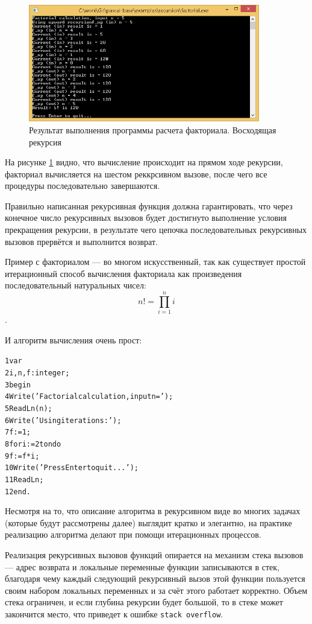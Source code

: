 \documentclass[12pt,a4paper]{article}
\begin{document}
\begin{figure}[h!]
	\centering	
	\includegraphics[width=0.9\textwidth]{images/lec14-pic02.png}
	\caption{Результат выполнения программы расчета факториала. Восходящая рекурсия}
	\label{pic02}	
\end{figure}

На рисунке \ref{pic02} видно, что вычисление происходит на прямом ходе рекурсии, факториал вычисляется на шестом реккрсивном вызове, после чего все процедуры последовательно завершаются.

Правильно написанная рекурсивная функция должна гарантировать, что через конечное число рекурсивных вызовов будет достигнуто выполнение условия прекращения рекурсии, в результате чего цепочка последовательных рекурсивных вызовов прервётся и выполнится возврат.

Пример с факториалом --- во многом искусственный, так как существует простой итерационный способ вычисления факториала как произведения последовательный натуральных чисел: 
$$n!=\prod_{i=1}^{n}i$$.

И алгоритм вычисления очень прост:

\begin{alltt}
	1 var
	2   i, n, f: integer;
	3 begin
	4   Write('Factorial calculation, input n = ');
	5   ReadLn(n);
	6   Write('Using iterations:');
	7   f := 1;
	8   for i:=2 to n do
	9     f := f * i;
	10   Write('Press Enter to quit...');
	11   ReadLn;
	12 end.
\end{alltt}

Несмотря на то, что описание алгоритма в рекурсивном виде во многих задачах (которые будут рассмотрены далее) выглядит кратко и элегантно, на практике реализацию алгоритма делают при помощи итерационных процессов. 

Реализация рекурсивных вызовов функций опирается на механизм стека вызовов --- адрес возврата и локальные переменные функции записываются в стек, благодаря чему каждый следующий рекурсивный вызов этой функции пользуется своим набором локальных переменных и за счёт этого работает корректно. Объем стека ограничен, и если глубина рекурсии будет большой, то в стеке может закончится место, что приведет к ошибке \texttt{stack overflow}.
\end{document}

